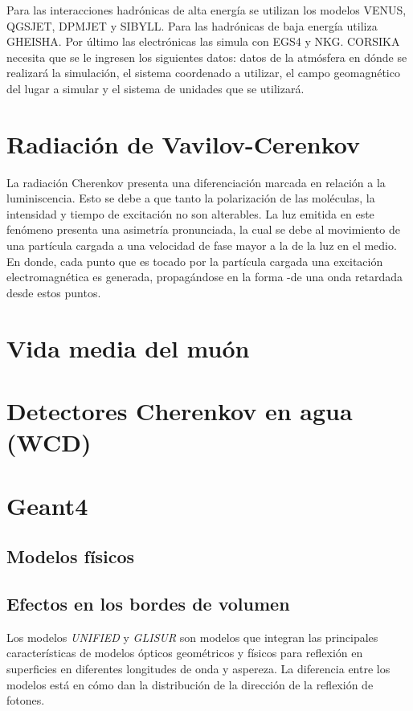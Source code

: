 \documentclass{book}
\begin{document}
Para las interacciones hadrónicas de alta energía se utilizan los modelos VENUS, QGSJET, DPMJET y SIBYLL. Para las hadrónicas de baja energía utiliza GHEISHA. Por último las electrónicas las simula con EGS4 y NKG. CORSIKA necesita que se le ingresen los siguientes datos: datos de la atmósfera en dónde se realizará la simulación, el sistema coordenado a utilizar, el campo geomagnético del lugar a simular y el sistema de unidades que se utilizará. \citep{HECK}

\section{Radiaci\'on de Vavilov-Cerenkov}
La radiaci\'on Cherenkov presenta una diferenciaci\'on marcada en relaci\'on a la luminiscencia. Esto se debe a que tanto la polarizaci\'on de las mol\'eculas, la intensidad y tiempo de excitaci\'on no son alterables.  La luz emitida en este fen\'omeno presenta una asimetr\'ia pronunciada, la cual se debe al movimiento de una part\'icula cargada a una velocidad de fase mayor a la de la luz en el medio. En donde, cada punto que es tocado por la part\'icula cargada una excitaci\'on electromagn\'etica es generada, propag\'andose en la forma -de una onda retardada desde estos puntos.  \citep{CHERENKOV}

\section{Vida media del mu\'on}

\section{Detectores Cherenkov en agua (WCD)}

\section{Geant4}

\subsection{Modelos f\'isicos}

\subsection{Efectos en los bordes de volumen}
Los modelos \textit{UNIFIED} y \textit{GLISUR} son modelos que integran las principales caracter\'isticas de modelos \'opticos geom\'etricos y f\'isicos para reflexi\'on en superficies en diferentes longitudes de onda y aspereza. La diferencia entre los modelos est\'a en c\'omo dan la distribuci\'on de la direcci\'on de la reflexi\'on de fotones.
\end{document}
